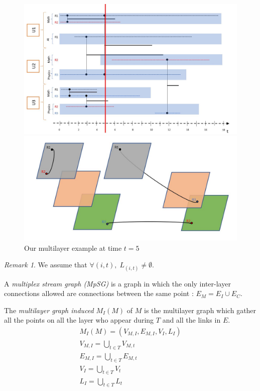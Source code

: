 \documentclass[dvipsnames,a4paper,11pt]{article}
\theoremstyle{definition}
\theoremstyle{remark}
\newtheorem{rmq}{Remark}
\theoremstyle{remark}
\begin{document}
	\begin{figure}	
		\begin{minipage}{0.49\linewidth}
			\includegraphics[width=\textwidth]{schemas/pauset.jpg}
		\end{minipage}
		\begin{minipage}{0.49\linewidth}
			\includegraphics[width=\textwidth]{schemas/pausetproj.jpg}
		\end{minipage}
		\caption{Our multilayer example at time $t=5$}
	\end{figure}
	
    \begin{rmq}
    	We assume that $\forall (i,t), \; L_{(i,t)} \neq \emptyset$.
    \end{rmq}

    A {\em multiplex stream graph (MpSG)} is a graph in which the only inter-layer connections allowed are connections between the same point : $E_M = E_I \cup E_C$.

    The {\em multilayer graph induced} $M_I(M)$ of $M$ is the multilayer graph which gather all the points on all the layer who appear during $T$ and all the links in $E$.
    \begin{align*}
    	M_I(M) = (V_{M,I}, E_{M,I}, V_I,L_I)\\
    	V_{M,I} = \bigcup_{t\in T} V_{M,t}\\
    	E_{M,I} = \bigcup_{t\in T} E_{M,t}\\
    	V_I = \bigcup_{t\in T} V_t \\
    	L_I = \bigcup_{t\in T} L_t\\
    \end{align*}
\end{document}
